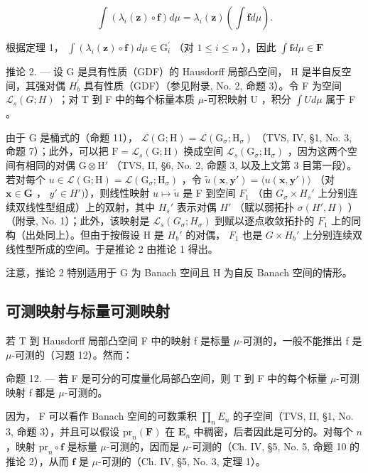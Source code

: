 \[
\int \left(\lambda_ {i} (\mathbf {z}) \circ \mathbf {f}\right) d \mu = \lambda_ {i} (\mathbf {z}) \left(\int \mathbf {f} d \mu\right).
\]

根据定理 1， \(\int (\lambda_i(\mathbf{z})\circ \mathbf{f})d\mu \in \mathrm{G}_i^\prime\) （对 \(1\leqslant i\leqslant n\) ），因此 \(\int \mathbf{f}d\mu \in \mathbf{F}\)

推论 2. --- 设 G 是具有性质（GDF）的 Hausdorff 局部凸空间， H 是半自反空间，其强对偶 \(H_{b}^{\prime}\) 具有性质（GDF）（参见附录, No. 2, 命题 3）。令 F 为空间 \(\mathcal{L}_{s}(G;H)\) ；对 T 到 F 中的每个标量本质 \(\mu\)-可积映射 U ，积分 \(\int U d\mu\) 属于 F 。

由于 G 是桶式的（命题 11）， \(\mathcal{L}(\mathrm{G};\mathrm{H}) = \mathcal{L}(\mathrm{G}_{\sigma};\mathrm{H}_{\sigma})\) （TVS, IV, §1, No. 3, 命题 7）；此外，可以把 \(\mathrm{F} = \mathcal{L}_s(\mathrm{G};\mathrm{H})\) 换成空间 \(\mathcal{L}_s(\mathrm{G}_{\sigma};\mathrm{H}_{\sigma})\) ，因为这两个空间有相同的对偶 \(\mathrm{G} \otimes \mathrm{H}'\) （TVS, II, §6, No. 2, 命题 3, 以及上文第 3 目第一段）。若对每个 \(u \in \mathcal{L}(\mathrm{G};\mathrm{H}) = \mathcal{L}(\mathrm{G}_{\sigma};\mathrm{H}_{\sigma})\) ，令 \(\widetilde{u}(\mathbf{x},\mathbf{y}') = \langle u(\mathbf{x},\mathbf{y}') \rangle\) （对 \(\mathbf{x} \in \mathbf{G}\) ， \(y' \in H')\)），则线性映射 \(u \mapsto \widetilde{u}\) 是 F 到空间 \(F_1\) （由 \(G_\sigma \times H_s'\) 上分别连续双线性型组成）上的双射，其中 \(H_s'\) 表示对偶 \(H'\) （赋以弱拓扑 \(\sigma(H', H)\) ）（附录, No. 1）；此外，该映射是 \(\mathcal{L}_s(G_\sigma; H_\sigma)\) 到赋以逐点收敛拓扑的 \(F_1\) 上的同构（出处同上）。但由于按假设 H 是 \(H_b'\) 的对偶， \(F_1\) 也是 \(G \times H_b'\) 上分别连续双线性型所成的空间。于是推论 2 由推论 1 得出。

注意，推论 2 特别适用于 G 为 Banach 空间且 H 为自反 Banach 空间的情形。

\subsection{可测映射与标量可测映射}

若 T 到 Hausdorff 局部凸空间 F 中的映射 f 是标量 \(\mu\)-可测的，一般不能推出 f 是 \(\mu\)-可测的（习题 12）。然而：

命题 12. --- 若 F 是可分的可度量化局部凸空间，则 T 到 F 中的每个标量 \(\mu\)-可测映射 f 都是 \(\mu\)-可测的。

因为， F 可以看作 Banach 空间的可数乘积 \(\prod_{n}E_{n}\) 的子空间（TVS, II, §1, No. 3, 命题 3），并且可以假设 \(\mathrm{pr}_n(\mathbf{F})\) 在 \(\mathbf{E}_n\) 中稠密，后者因此是可分的。对每个 \(n\) ，映射 \(\mathrm{pr}_n \circ \mathbf{f}\) 是标量 \(\mu\)-可测的，因而是 \(\mu\)-可测的（Ch. IV, §5, No. 5, 命题 10 的推论 2），从而 \(\mathbf{f}\) 是 \(\mu\)-可测的（Ch. IV, §5, No. 3, 定理 1）。

